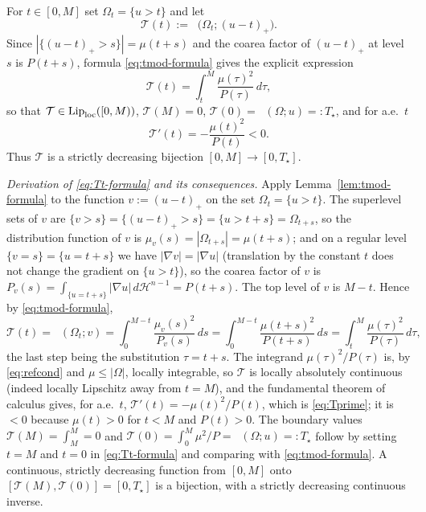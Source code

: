 \documentclass[11pt]{amsart}
\theoremstyle{definition}
\newcommand{\Om}{\Omega}
\newcommand{\abs}[1]{\left|#1\right|}
\newcommand{\dH}{\,d\mathcal H^{n-1}}
\DeclareMathOperator{\Tmod}{T_{\mathrm{mod}}}
\begin{document}
For $t\in[0,M]$ set $\Om_t=\{u>t\}$ and let
\begin{equation}\label{eq:Tt}
  \mathcal T(t):=\Tmod\bigl(\Om_t;(u-t)_+\bigr).
\end{equation}
Since $\abs{\{(u-t)_+>s\}}=\mu(t+s)$ and the coarea factor of $(u-t)_+$ at
level $s$ is $P(t+s)$, formula \eqref{eq:tmod-formula} gives the explicit
expression
\begin{equation}\label{eq:Tt-formula}
  \mathcal T(t)=\int_t^M\frac{\mu(\tau)^2}{P(\tau)}\,d\tau,
\end{equation}
so that $\mathcal T\in\mathrm{Lip}_{\rm loc}([0,M))$, $\mathcal T(M)=0$,
$\mathcal T(0)=\Tmod(\Om;u)=:T_\star$, and for a.e.\ $t$
\begin{equation}\label{eq:Tprime}
  \mathcal T'(t)=-\frac{\mu(t)^2}{P(t)}<0 .
\end{equation}
Thus $\mathcal T$ is a strictly decreasing bijection $[0,M]\to[0,T_\star]$.

\emph{Derivation of \eqref{eq:Tt-formula} and its consequences.} Apply
Lemma~\ref{lem:tmod-formula} to the function $v:=(u-t)_+$ on the set
$\Om_t=\{u>t\}$. The superlevel sets of $v$ are
$\{v>s\}=\{(u-t)_+>s\}=\{u>t+s\}=\Om_{t+s}$, so the distribution function of
$v$ is $\mu_v(s)=\abs{\Om_{t+s}}=\mu(t+s)$; and on a regular level
$\{v=s\}=\{u=t+s\}$ we have $\abs{\nabla v}=\abs{\nabla u}$ (translation by
the constant $t$ does not change the gradient on $\{u>t\}$), so the coarea
factor of $v$ is $P_v(s)=\int_{\{u=t+s\}}\abs{\nabla u}\dH=P(t+s)$. The top
level of $v$ is $M-t$. Hence by \eqref{eq:tmod-formula},
\[
  \mathcal T(t)=\Tmod(\Om_t;v)
  =\int_0^{M-t}\frac{\mu_v(s)^2}{P_v(s)}\,ds
  =\int_0^{M-t}\frac{\mu(t+s)^2}{P(t+s)}\,ds
  =\int_t^M\frac{\mu(\tau)^2}{P(\tau)}\,d\tau,
\]
the last step being the substitution $\tau=t+s$. The integrand
$\mu(\tau)^2/P(\tau)$ is, by \eqref{eq:refcond} and $\mu\le\abs\Om$, locally
integrable, so $\mathcal T$ is locally absolutely continuous (indeed locally
Lipschitz away from $t=M$), and the fundamental theorem of calculus gives,
for a.e.\ $t$, $\mathcal T'(t)=-\mu(t)^2/P(t)$, which is \eqref{eq:Tprime};
it is $<0$ because $\mu(t)>0$ for $t<M$ and $P(t)>0$. The boundary values
$\mathcal T(M)=\int_M^M=0$ and $\mathcal T(0)=\int_0^M\mu^2/P
=\Tmod(\Om;u)=:T_\star$ follow by setting $t=M$ and $t=0$ in
\eqref{eq:Tt-formula} and comparing with \eqref{eq:tmod-formula}. A
continuous, strictly decreasing function from $[0,M]$ onto
$[\mathcal T(M),\mathcal T(0)]=[0,T_\star]$ is a bijection, with a strictly
decreasing continuous inverse.
\end{document}
